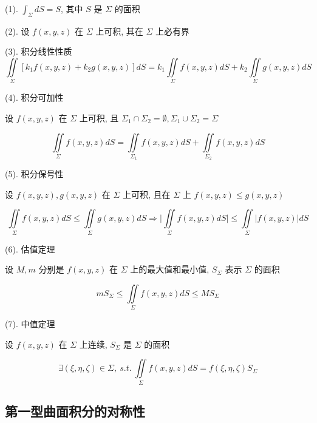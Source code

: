 \begin{corollary}

	(1). $\displaystyle{\int_{\Sigma} dS = S}$, 其中 $S$ 是 $\Sigma$ 的面积

	(2). 设 $f(x,y,z)$ 在 $\Sigma$ 上可积, 其在 $\Sigma$ 上必有界

	(3). 积分线性性质
	$$\iint\limits_{\Sigma}\left[k_{1}f(x,y,z) + k_{2} g(x,y,z)\right]dS = k_{1}\iint\limits_{\Sigma}f(x,y,z)dS+k_{2}\iint\limits_{\Sigma}g(x,y,z)dS$$

	(4). 积分可加性

	设 $f(x,y,z)$ 在 $\Sigma$ 上可积, 且 $\Sigma_{1}\cap \Sigma_{2}=\emptyset, \Sigma_{1}\cup \Sigma_{2}=\Sigma$

	$$\iint\limits_{\Sigma}f(x,y,z)dS = \iint\limits_{\Sigma_{1}}f(x,y,z)dS + \iint\limits_{\Sigma_{2}}f(x,y,z)dS$$

	(5). 积分保号性

	设 $f(x,y,z), g(x,y,z)$ 在 $\Sigma$ 上可积, 且在 $\Sigma$ 上 $f(x,y,z) \leq g(x,y,z)$

	$$\iint\limits_{\Sigma}f(x,y,z)dS \leq \iint\limits_{\Sigma}g(x,y,z)dS\Rightarrow 
	\big|\iint\limits_{\Sigma}f(x,y,z)dS\big| \leq \iint\limits_{\Sigma}\big|f(x,y,z)\big|dS$$

	(6). 估值定理
	
	设 $M,m$ 分别是 $f(x,y,z)$ 在 $\Sigma$ 上的最大值和最小值, $S_{\Sigma}$ 表示 $\Sigma$ 的面积 
	
	$$mS_{\Sigma} \leq \iint\limits_{\Sigma}f(x,y,z)dS \leq MS_{\Sigma}$$

	(7). 中值定理

	设 $f(x,y,z)$ 在 $\Sigma$ 上连续, $S_{\Sigma}$ 是 $\Sigma$ 的面积

	$$\exists (\xi,\eta,\zeta)\in \Sigma,\ s.t.\ \iint\limits_{\Sigma}f(x,y,z) dS = f(\xi,\eta,\zeta)S_{\Sigma}$$
\end{corollary}

\subsection{第一型曲面积分的对称性}

